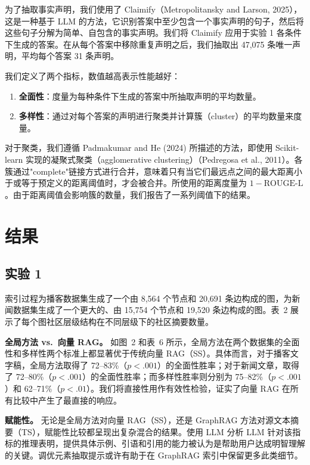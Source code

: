 \documentclass[11pt,UTF8,fontset=fandol]{ctexart}
\begin{document}
为了抽取事实声明，我们使用了 Claimify（Metropolitansky and Larson, 2025），这是一种基于 LLM 的方法，它识别答案中至少包含一个事实声明的句子，然后将这些句子分解为简单、自包含的事实声明。我们将 Claimify 应用于实验 1 各条件下生成的答案。在从每个答案中移除重复声明之后，我们抽取出 47,075 条唯一声明，平均每个答案 31 条声明。

我们定义了两个指标，数值越高表示性能越好：

\begin{enumerate}[leftmargin=2em]
\item \textbf{全面性}：度量为每种条件下生成的答案中所抽取声明的平均数量。
\item \textbf{多样性}：通过对每个答案的声明进行聚类并计算簇（cluster）的平均数量来度量。
\end{enumerate}

对于聚类，我们遵循 Padmakumar and He (2024) 所描述的方法，即使用 Scikit-learn 实现的凝聚式聚类（agglomerative clustering）（Pedregosa et al., 2011）。各簇通过"complete"链接方式进行合并，意味着只有当它们最远点之间的最大距离小于或等于预定义的距离阈值时，才会被合并。所使用的距离度量为 $1 - \text{ROUGE-L}$。由于距离阈值会影响簇的数量，我们报告了一系列阈值下的结果。

\section{结果}

\subsection{实验 1}

索引过程为播客数据集生成了一个由 8,564 个节点和 20,691 条边构成的图，为新闻数据集生成了一个更大的、由 15,754 个节点和 19,520 条边构成的图。表~2 展示了每个图社区层级结构在不同层级下的社区摘要数量。

\textbf{全局方法 vs.\ 向量 RAG。} 如图~2 和表~6 所示，全局方法在两个数据集的全面性和多样性两个标准上都显著优于传统向量 RAG（SS）。具体而言，对于播客文字稿，全局方法取得了 72--83\%（$p<.001$）的全面性胜率；对于新闻文章，取得了 72--80\%（$p<.001$）的全面性胜率；而多样性胜率则分别为 75--82\%（$p<.001$）和 62--71\%（$p<.01$）。我们将直接性用作有效性检验，证实了向量 RAG 在所有比较中产生了最直接的响应。

\textbf{赋能性。} 无论是全局方法对向量 RAG（SS），还是 GraphRAG 方法对源文本摘要（TS），赋能性比较都呈现出复杂混合的结果。使用 LLM 分析 LLM 针对该指标的推理表明，提供具体示例、引语和引用的能力被认为是帮助用户达成明智理解的关键。调优元素抽取提示或许有助于在 GraphRAG 索引中保留更多此类细节。
\end{document}
